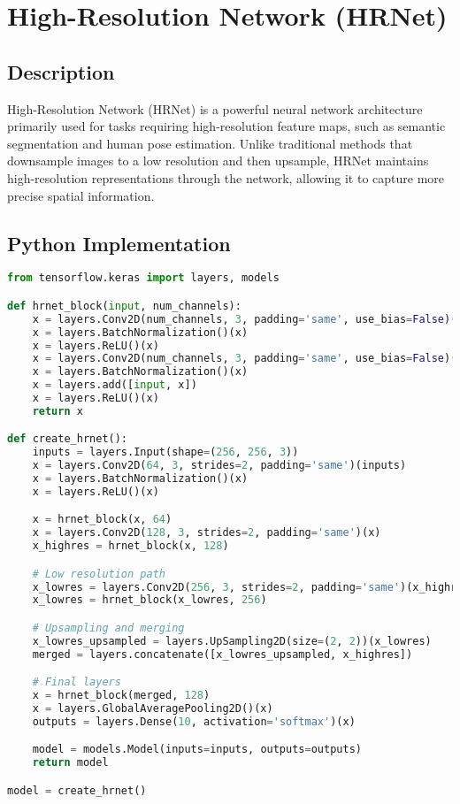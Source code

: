 \chapter{High-Resolution Network (HRNet)}

\section{Description}
High-Resolution Network (HRNet) is a powerful neural network architecture primarily used for tasks requiring high-resolution feature maps, such as semantic segmentation and human pose estimation. Unlike traditional methods that downsample images to a low resolution and then upsample, HRNet maintains high-resolution representations through the network, allowing it to capture more precise spatial information.

\section{Python Implementation}
\begin{lstlisting}[language=Python]
from tensorflow.keras import layers, models

def hrnet_block(input, num_channels):
    x = layers.Conv2D(num_channels, 3, padding='same', use_bias=False)(input)
    x = layers.BatchNormalization()(x)
    x = layers.ReLU()(x)
    x = layers.Conv2D(num_channels, 3, padding='same', use_bias=False)(x)
    x = layers.BatchNormalization()(x)
    x = layers.add([input, x])
    x = layers.ReLU()(x)
    return x

def create_hrnet():
    inputs = layers.Input(shape=(256, 256, 3))
    x = layers.Conv2D(64, 3, strides=2, padding='same')(inputs)
    x = layers.BatchNormalization()(x)
    x = layers.ReLU()(x)

    x = hrnet_block(x, 64)
    x = layers.Conv2D(128, 3, strides=2, padding='same')(x)
    x_highres = hrnet_block(x, 128)

    # Low resolution path
    x_lowres = layers.Conv2D(256, 3, strides=2, padding='same')(x_highres)
    x_lowres = hrnet_block(x_lowres, 256)

    # Upsampling and merging
    x_lowres_upsampled = layers.UpSampling2D(size=(2, 2))(x_lowres)
    merged = layers.concatenate([x_lowres_upsampled, x_highres])

    # Final layers
    x = hrnet_block(merged, 128)
    x = layers.GlobalAveragePooling2D()(x)
    outputs = layers.Dense(10, activation='softmax')(x)

    model = models.Model(inputs=inputs, outputs=outputs)
    return model

model = create_hrnet()
\end{lstlisting}

